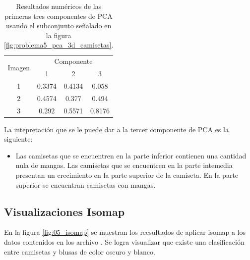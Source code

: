 \begin{table}[H]
    \centering
    \begin{tabular}{cccc} \hline
        \multirow{2}{*}{Imagen} & \multicolumn{3}{c}{Componente}                   \\
                                & 1                              & 2      & 3      \\ \hline
        1                       & 0.3374                         & 0.4134 & 0.058  \\
        2                       & 0.4574                         & 0.377  & 0.494  \\
        3                       & 0.292                          & 0.5571 & 0.8176 \\ \hline
    \end{tabular}
    \caption{Resultados numéricos de las primeras tres componentes de PCA usando el subconjunto señalado en la figura \ref{fig:problema5_pca_3d_camisetas}.}
    \label{table:pca_3d}
\end{table}

La intepretación que se le puede dar a la tercer componente de PCA es la siguiente:

\begin{itemize}
    \item Las camisetas que se encuentren en la parte inferior contienen una cantidad nula de mangas. Las camisetas que se encuentren en la parte intemedia presentan un crecimiento en la parte superior de la camiseta. En la parte superior se encuentran camisetas con mangas.
\end{itemize}

\subsection*{Visualizaciones Isomap}

En la figura \ref{fig:05_isomap} se muestran los reesultados de aplicar isomap a los datos contenidos en los archivo . Se logra visualizar que existe una clasificación entre camisetas y blusas de color oscuro y blanco.

